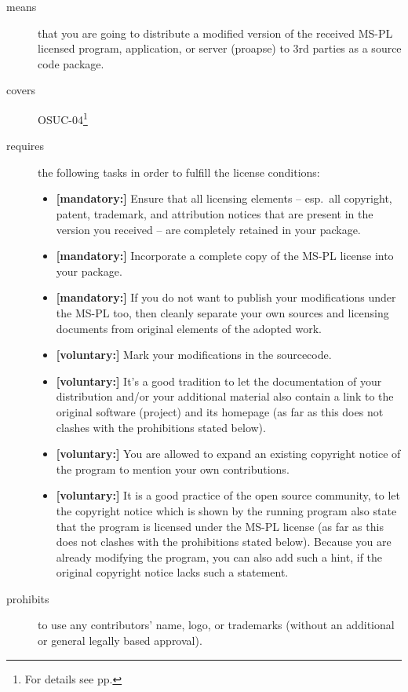 \begin{description}

\item[means] that you are going to distribute a modified version of the received
MS-PL licensed program, application, or server (proapse) to 3rd parties as a
source code package.

\item[covers] OSUC-04\footnote{For details see pp. \pageref{OSUC-04-DEF}}

\item[requires] the following tasks in order to fulfill the license conditions:
\begin{itemize}
  \item \textbf{[mandatory:]} Ensure that all licensing elements -- esp.\ all
  copyright, patent, trademark, and attribution notices that are present in the
  version you received -- are completely retained in your package.
 
  \item \textbf{[mandatory:]} Incorporate a complete copy of the MS-PL license
  into your package.
  
  \item \textbf{[mandatory:]} If you do not want to publish your modifications
  under the MS-PL too, then cleanly separate your own sources and licensing
  documents from original elements of the adopted work.
  
  \item \textbf{[voluntary:]} Mark your modifications in the sourcecode.
  
  \item \textbf{[voluntary:]} It's a good tradition to let the documentation of
  your distribution and/or your additional material also contain a link to the
  original software (project) and its homepage (as far as this does not clashes
  with the prohibitions stated below).
  
  \item \textbf{[voluntary:]} You are allowed to expand an existing copyright
  notice of the program to mention your own contributions.
  
  \item \textbf{[voluntary:]} It is a good practice of the open source
  community, to let the copyright notice which is shown by the running program
  also state that the program is licensed under the MS-PL license (as far as
  this does not clashes with the prohibitions stated below). Because you are
  already modifying the program, you can also add such a hint, if the 
  original copyright notice lacks such a statement.
    
\end{itemize}

\item[prohibits] to use any contributors' name, logo, or trademarks (without an
additional or general legally based approval).

\end{description}


